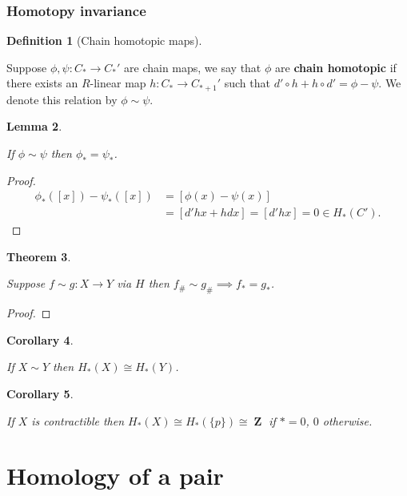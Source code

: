 \documentclass[10pt,]{book}
\newcommand{\terminology}[1]{\textbf{#1}}
\theoremstyle{plain}
\newtheorem{theorem}{Theorem}[section]
\newtheorem{corollary}[theorem]{Corollary}
\newtheorem{lemma}[theorem]{Lemma}
\theoremstyle{definition}
\newtheorem{definition}[theorem]{Definition}
\numberwithin{equation}{section}
\DeclareMathOperator{\ZZ}{\mathbf{Z}}
\begin{document}
\subsubsection[Homotopy invariance]{Homotopy invariance}\label{subsubsection-1}
\begin{definition}[Chain homotopic maps]\label{definition-11}

              Suppose \(\phi,\psi\colon C_* \to C_*'\) are chain maps, we say that \(\phi\) are \terminology{chain homotopic} if there exists an \(R\)-linear map \(h\colon C_* \to C_{*+1}'\) such that \(d'\circ h + h \circ d' = \phi - \psi\).
              We denote this relation by \(\phi \sim \psi\).
              \end{definition}
\begin{lemma}\label{lemma-4}

                If \(\phi \sim \psi\) then \(\phi_* = \psi_*\).
              \end{lemma}
\begin{proof}
\begin{align*}
\phi_*([x]) - \psi_*([x]) &= [\phi(x) - \psi(x)]\\
&= [d'hx + hdx] = [d'hx] = 0 \in H_*(C').
\end{align*}\end{proof}
\begin{theorem}\label{theorem-1}

                Suppose \(f\sim g\colon X\to Y\) via \(H\) then \(f_\# \sim g_\# \implies f_* = g_*\).
              \end{theorem}
\begin{proof}
\end{proof}
\begin{corollary}\label{corollary-2}

                If \(X\sim Y\) then \(H_*(X) \cong H_*(Y)\).
              \end{corollary}
\begin{corollary}\label{corollary-3}

                If \(X\) is contractible then \(H_*(X) \cong H_*(\{p\}) \cong \ZZ\) if \(* = 0\), \(0\) otherwise.
              \end{corollary}
\typeout{************************************************}
\typeout{************************************************}
\section[Homology of a pair]{Homology of a pair}\label{section-4}
\typeout{************************************************}
\typeout{************************************************}
\end{document}
